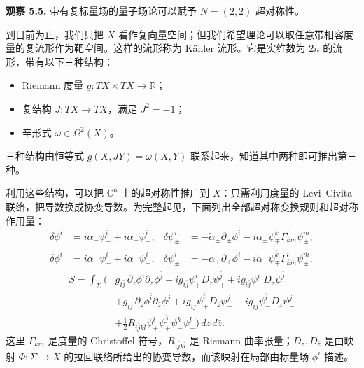 \begin{note}\label{note:complex-scalar-susy}
\textbf{观察 5.5.} 带有复标量场的量子场论可以赋予 $N=(2,2)$ 超对称性。
\end{note}

到目前为止，我们只把 $X$ 看作复向量空间；但我们希望理论可以取任意带相容度量的复流形作为靶空间。这样的流形称为 Kähler 流形。它是实维数为 $2n$ 的流形，带有以下三种结构：
\begin{itemize}
  \item Riemann 度量 $g\colon TX\times TX\to\mathbb R$；
  \item 复结构 $J\colon TX\to TX$，满足 $J^2=-1$；
  \item 辛形式 $\omega\in\Omega^2(X)$。
\end{itemize}
三种结构由恒等式 $g(X,JY)=\omega(X,Y)$ 联系起来，知道其中两种即可推出第三种。

利用这些结构，可以把 $\mathbb C^n$ 上的超对称性推广到 $X$：只需利用度量的 Levi--Civita 联络，把导数换成协变导数。为完整起见，下面列出全部超对称变换规则和超对称作用量：
\begin{align*}
  \delta\phi^i&=i\alpha_-\psi^i_++i\alpha_+\psi^i_-,&
  \delta\psi^i_\pm&=-\widetilde\alpha_\pm\partial_\pm\phi^i
    -i\alpha_\pm\psi^k_\mp\Gamma^i_{km}\psi^m_\pm,\\
  \delta\phi^{\bar i}&=i\widetilde\alpha_-\psi^{\bar i}_+
    +i\widetilde\alpha_+\psi^{\bar i}_-,&
  \delta\psi^{\bar i}_\pm&=-\alpha_\pm\partial_\pm\phi^{\bar i}
    -i\widetilde\alpha_\pm\psi^{\bar k}_\mp
       \Gamma^{\bar i}_{\bar k\bar m}\psi^{\bar m}_\pm,
\end{align*}
\begin{align*}
S=\int_\Sigma\bigl(&g_{i\bar j}\,\partial_z\phi^i\partial_{\bar z}\phi^{\bar j}
 +ig_{i\bar j}\psi^i_+D_{\bar z}\psi^{\bar j}_+
 +ig_{i\bar j}\psi^i_-D_z\psi^{\bar j}_-\\
&+g_{\bar i j}\,\partial_z\phi^{\bar i}\partial_{\bar z}\phi^j
 +ig_{\bar i j}\psi^{\bar i}_+D_{\bar z}\psi^j_+
 +ig_{\bar i j}\psi^{\bar i}_-D_z\psi^j_-\\
&+\tfrac12R_{i\bar j k\bar l}
  \psi^i_+\psi^{\bar j}_+\psi^k_-\psi^{\bar l}_-\bigr)\,dz\,d\bar z.
\end{align*}
这里 $\Gamma^i_{km}$ 是度量的 Christoffel 符号，$R_{i\bar j k\bar l}$ 是 Riemann 曲率张量；$D_z,D_{\bar z}$ 是由映射 $\Phi\colon\Sigma\to X$ 的拉回联络所给出的协变导数，而该映射在局部由标量场 $\phi^i$ 描述。

